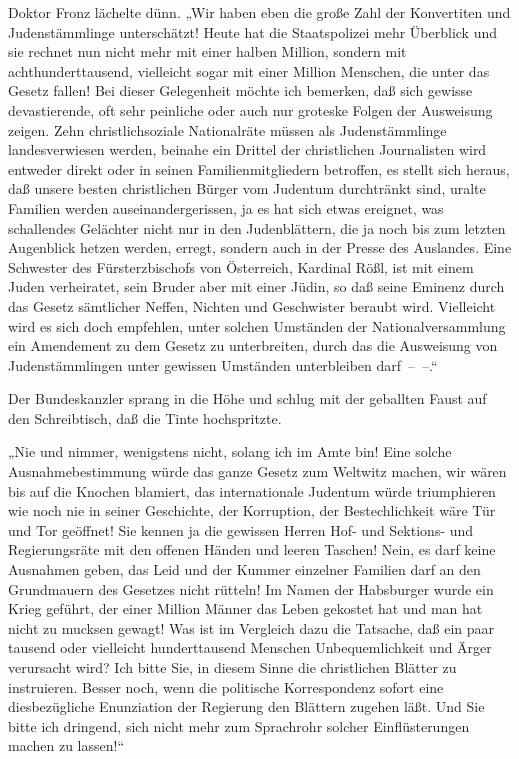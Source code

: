 Doktor Fronz lächelte dünn. „Wir haben eben die große Zahl der
Konvertiten und Judenstämmlinge unterschätzt! Heute hat die
Staatspolizei mehr Überblick und sie rechnet nun nicht mehr mit
einer halben Million, sondern mit achthunderttausend, vielleicht
sogar mit einer Million Menschen, die unter das Gesetz fallen! Bei
dieser Gelegenheit möchte ich bemerken, daß sich gewisse
devastierende, oft sehr peinliche oder auch nur groteske Folgen der
Ausweisung zeigen. Zehn christlichsoziale Nationalräte müssen als
Judenstämmlinge landesverwiesen werden, beinahe ein Drittel der
christlichen Journalisten wird entweder  direkt oder
in seinen Familienmitgliedern betroffen, es stellt sich heraus, daß
unsere besten christlichen Bürger vom Judentum durchtränkt sind,
uralte Familien werden auseinandergerissen, ja es hat sich etwas
ereignet, was schallendes Gelächter nicht nur in den Judenblättern,
die ja noch bis zum letzten Augenblick hetzen werden, erregt,
sondern auch in der Presse des Auslandes. Eine Schwester des
Fürsterzbischofs von Österreich, Kardinal Rößl, ist mit einem
Juden verheiratet, sein Bruder aber mit einer Jüdin, so daß seine
Eminenz durch das Gesetz sämtlicher Neffen, Nichten und Geschwister
beraubt wird. Vielleicht wird es sich doch empfehlen, unter solchen
Umständen der Nationalversammlung ein Amendement zu dem Gesetz zu
unterbreiten, durch das die Ausweisung von Judenstämmlingen unter
gewissen Umständen unterbleiben darf~–~–.“

Der Bundeskanzler sprang in die Höhe und schlug mit der geballten
Faust auf den Schreibtisch, daß die Tinte hochspritzte.

„Nie und nimmer, wenigstens nicht, solang ich im Amte bin! Eine
solche Ausnahmebestimmung würde das ganze Gesetz zum Weltwitz
machen, wir wären bis auf die Knochen blamiert, das internationale
Judentum würde triumphieren wie noch nie in seiner Geschichte, der
Korruption, der Bestechlichkeit wäre Tür und Tor geöffnet! Sie
kennen ja die gewissen Herren Hof- und Sektions- und Regierungsräte
mit den offenen Händen und leeren Taschen! Nein, es darf keine
Ausnahmen geben, das Leid und der Kummer einzelner Familien darf an
den Grundmauern des Gesetzes nicht rütteln! Im Namen der Habsburger
 wurde ein Krieg geführt, der einer Million Männer
das Leben gekostet hat und man hat nicht zu mucksen gewagt! Was ist
im Vergleich dazu die Tatsache, daß ein paar tausend oder
vielleicht hunderttausend Menschen Unbequemlichkeit und Ärger
verursacht wird? Ich bitte Sie, in diesem Sinne die christlichen
Blätter zu instruieren. Besser noch, wenn die politische
Korrespondenz sofort eine diesbezügliche Enunziation der Regierung
den Blättern zugehen läßt. Und Sie bitte ich dringend, sich nicht
mehr zum Sprachrohr solcher Einflüsterungen machen zu lassen!“


